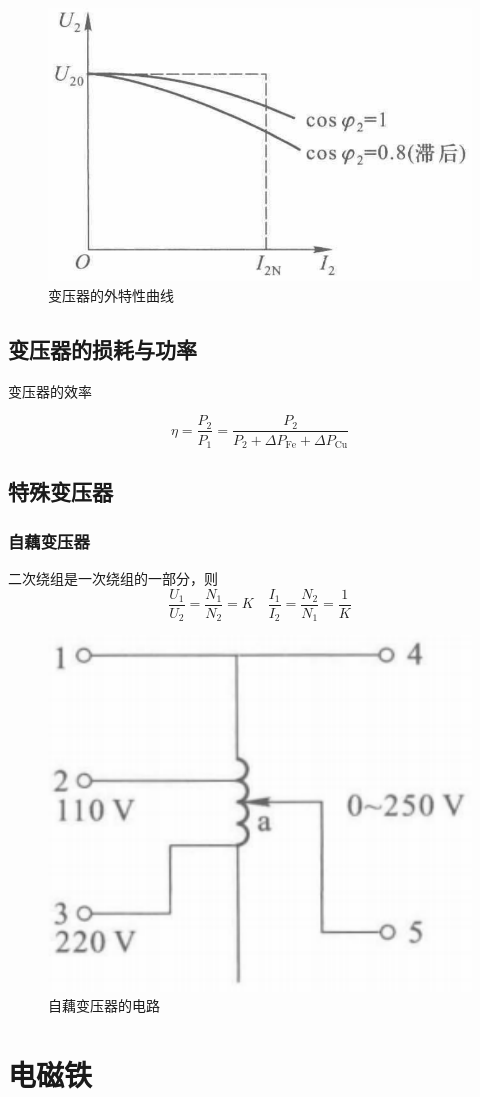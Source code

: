 \documentclass[12pt]{article}
\begin{document}
\begin{figure}[!h]
    \centering
    \includegraphics[width = .4\textwidth]{graphics/Screenshot 2025-09-13 at 01.26.07.png}
    \caption{变压器的外特性曲线}
    \label{变压器的外特性曲线}
\end{figure}

\subsection{变压器的损耗与功率}

变压器的效率

\begin{equation}
\eta=\frac{P_2}{P_1}=\frac{P_2}{P_2+\Delta P_{\mathrm{Fe}}+\Delta P_{\mathrm{Cu}}}
\end{equation}

\subsection{特殊变压器}

\subsubsection{自藕变压器}

二次绕组是一次绕组的一部分，则
\begin{equation}
    \frac{U_1}{U_2} = \frac{N_1}{N_2} = K \quad
    \frac{I_1}{I_2} = \frac{N_2}{N_1} = \frac{1}{K}
\end{equation}

\begin{figure}[!h]
    \centering
    \includegraphics[width = .25\textwidth]{graphics/Screenshot 2025-09-15 at 18.10.20.png}
    \caption{自藕变压器的电路}
    \label{自藕变压器的电路}
\end{figure}

\section{电磁铁}
\end{document}

